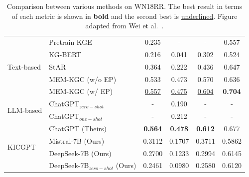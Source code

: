 \documentclass[12pt,a4paper]{article}
\begin{document}
\begin{table}
\begin{tabular}{l|l|c|c|c|c|}
        \multirow{5}{*}{Text-based}
        & Pretrain-KGE~\cite{zhang2020pretrain}    & 0.235             & -                 & -                 & 0.557             \\
        & KG-BERT~\cite{yao2019kgbert}             & 0.216             & 0.041             & 0.302             & 0.524             \\
        & StAR~\cite{wang2021structure}            & 0.364             & 0.222             & 0.436             & 0.647             \\
        & MEM-KGC (w/o EP)~\cite{choi2021mem}      & 0.533             & 0.473             & 0.570             & 0.636             \\
        & MEM-KGC (w/ EP)~\cite{choi2021mem}       & \underline{0.557} & \underline{0.475} & \underline{0.604} & \textbf{0.704} \\
        \midrule

        \multirow{2}{*}{LLM-based}
        & ChatGPT$_{zero-shot}$~\cite{zhu2023llms} & -                 & 0.190             & -                 & -                 \\
        & ChatGPT$_{one-shot}$~\cite{zhu2023llms}  & -                 & 0.212             & -                 & -                 \\

        \midrule

        \multirow{4}{*}{KICGPT}
        & ChatGPT (Theirs)                         & \textbf{0.564}    & \textbf{0.478}    & \textbf{0.612}    & \underline{0.677} \\
        & Mistral-7B (Ours)                        & 0.3112            & 0.1707            & 0.3711            & 0.5862            \\
        & DeepSeek-7B (Ours)                       & 0.2700            & 0.1233            & 0.2994            & 0.6145            \\
        & DeepSeek-7B$_{zero-shot}$ (Ours)         & 0.2461            & 0.0980            & 0.2580            & 0.6120            \\

        \bottomrule
    \end{tabular}

    \caption{Comparison between various methods on WN18RR. The best result in terms of each metric is shown in \textbf{bold} and the second best is \underline{underlined}. Figure adapted from Wei et al.~\cite{wei2023kicgpt}.}
    \label{tab:kicgpt_detailed_comparison}
\end{table}
\end{document}
